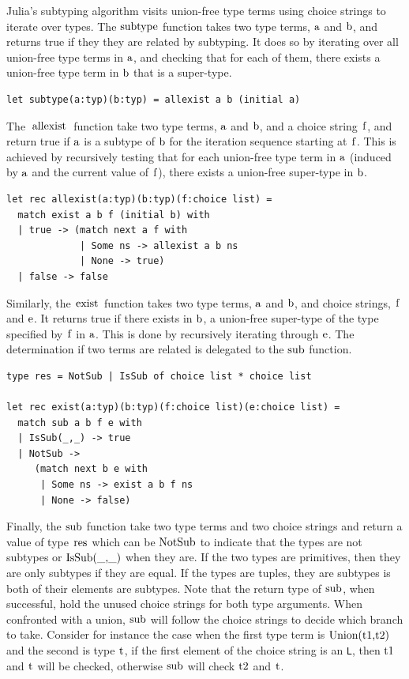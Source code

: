 \documentclass[a4paper,english]{lipics-v2019}
\renewcommand{\L}{{\tt L}\xspace}
\renewcommand{\c}[1]{\ensuremath{\text{\lstinline{#1}}}\xspace}
\begin{document}
Julia's subtyping algorithm visits union-free type terms using choice
strings to iterate over types.  The \c{subtype} function takes two type
terms, \c a and \c b, and returns true if they they are related by
subtyping. It does so by iterating over all union-free type terms in \c a,
and checking that for each of them, there exists a union-free type term in
\c b that is a super-type.

\begin{lstlisting}
let subtype(a:typ)(b:typ) = allexist a b (initial a)
\end{lstlisting}

\noindent
The \c{allexist} function take two type terms, \c a and \c b, and a choice
string \c f, and return true if \c a is a subtype of \c b for the iteration
sequence starting at \c f. This is achieved by recursively testing that for
each union-free type term in \c a (induced by \c a and the current value of
\c f), there exists a union-free super-type in \c b.

\newpage
\begin{lstlisting}
let rec allexist(a:typ)(b:typ)(f:choice list) =
  match exist a b f (initial b) with 
  | true -> (match next a f with
             | Some ns -> allexist a b ns 
             | None -> true) 
  | false -> false
\end{lstlisting}

\noindent
Similarly, the \c{exist} function takes two type terms, \c a and \c b, and
choice strings, \c f and \c e. It returns true if there exists in \c b, a
union-free super-type of the type specified by \c f in \c a. This is done by
recursively iterating through \c e. The determination if two terms are
related is delegated to the \c{sub} function.

\begin{lstlisting}
type res = NotSub | IsSub of choice list * choice list

let rec exist(a:typ)(b:typ)(f:choice list)(e:choice list) =
  match sub a b f e with 
  | IsSub(_,_) -> true 
  | NotSub -> 
     (match next b e with
      | Some ns -> exist a b f ns 
      | None -> false) 
\end{lstlisting}

\noindent
Finally, the \c{sub} function take two type terms and two choice strings and
return a value of type \c{res} which can be \c{NotSub} to indicate that the
types are not subtypes or \c{IsSub(_,_)} when they are.  If the two types
are primitives, then they are only subtypes if they are equal.  If the types
are tuples, they are subtypes is both of their elements are subtypes. Note
that the return type of \c{sub}, when successful, hold the unused choice
strings for both type arguments. When confronted with a union, \c{sub} will
follow the choice strings to decide which branch to take. Consider for
instance the case when the first type term is \c{Union(t1,t2)} and the
second is type \c{t}, if the first element of the choice string is an \L,
then \c{t1} and \c{t} will be checked, otherwise \c{sub} will check \c{t2}
and \c{t}.
\end{document}
